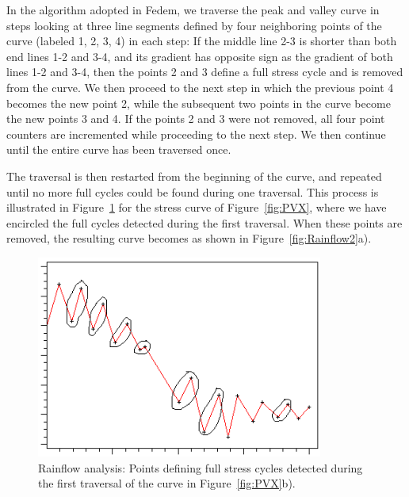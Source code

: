 In the algorithm adopted in Fedem, we traverse the peak and valley curve in
steps looking at three line segments defined by four neighboring points of the
curve (labeled 1, 2, 3, 4) in each step:
If the middle line 2-3 is shorter than both end lines 1-2 and 3-4, and its
gradient has opposite sign as the gradient of both lines 1-2 and 3-4, then
the points 2 and 3 define a full stress cycle and is removed from the curve.
We then proceed to the next step in which the previous point 4 becomes the
new point 2, while the subsequent two points in the curve become the new points
3 and 4.
If the points 2 and 3 were not removed, all four point counters are incremented
while proceeding to the next step.
We then continue until the entire curve has been traversed once.

The traversal is then restarted from the beginning of the curve, and
repeated until no more full cycles could be found during one traversal.
This process is illustrated in Figure~\ref{fig:Rainflow1} for the stress
curve of Figure~\ref{fig:PVX}, where we have encircled the full cycles detected
during the first traversal.
When these points are removed, the resulting curve becomes as shown in
Figure~\ref{fig:Rainflow2}a).

\begin{figure}[b]
\center\includegraphics[width=0.84\textwidth]{Figures/LoaderRos9_pass0}
\caption{Rainflow analysis: Points defining full stress cycles detected
during the first traversal of the curve in Figure~\ref{fig:PVX}b).}
\label{fig:Rainflow1}
\end{figure}

